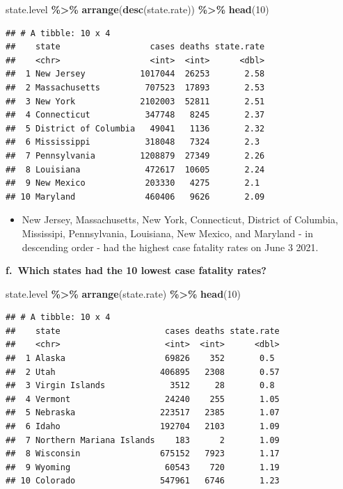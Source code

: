 \documentclass[
  openany]{book}
\newenvironment{Shaded}{\begin{snugshade}}{\end{snugshade}}
\newcommand{\DecValTok}[1]{\textcolor[rgb]{0.00,0.00,0.81}{#1}}
\newcommand{\FunctionTok}[1]{\textcolor[rgb]{0.13,0.29,0.53}{\textbf{#1}}}
\newcommand{\NormalTok}[1]{#1}
\newcommand{\SpecialCharTok}[1]{\textcolor[rgb]{0.81,0.36,0.00}{\textbf{#1}}}
\providecommand{\tightlist}{%
  \setlength{\itemsep}{0pt}\setlength{\parskip}{0pt}}
\begin{document}
\begin{Shaded}
\begin{Highlighting}[]
\NormalTok{state.level }\SpecialCharTok{\%\textgreater{}\%} 
  \FunctionTok{arrange}\NormalTok{(}\FunctionTok{desc}\NormalTok{(state.rate)) }\SpecialCharTok{\%\textgreater{}\%} 
  \FunctionTok{head}\NormalTok{(}\DecValTok{10}\NormalTok{)}
\end{Highlighting}
\end{Shaded}

\begin{verbatim}
## # A tibble: 10 x 4
##    state                  cases deaths state.rate
##    <chr>                  <int>  <int>      <dbl>
##  1 New Jersey           1017044  26253       2.58
##  2 Massachusetts         707523  17893       2.53
##  3 New York             2102003  52811       2.51
##  4 Connecticut           347748   8245       2.37
##  5 District of Columbia   49041   1136       2.32
##  6 Mississippi           318048   7324       2.3 
##  7 Pennsylvania         1208879  27349       2.26
##  8 Louisiana             472617  10605       2.24
##  9 New Mexico            203330   4275       2.1 
## 10 Maryland              460406   9626       2.09
\end{verbatim}

\begin{itemize}
\tightlist
\item
  New Jersey, Massachusetts, New York, Connecticut, District of Columbia, Mississipi, Pennsylvania, Louisiana, New Mexico, and Maryland - in descending order - had the highest case fatality rates on June 3 2021.
\end{itemize}

\textbf{f.~Which states had the 10 lowest case fatality rates?}

\begin{Shaded}
\begin{Highlighting}[]
\NormalTok{state.level }\SpecialCharTok{\%\textgreater{}\%} 
  \FunctionTok{arrange}\NormalTok{(state.rate) }\SpecialCharTok{\%\textgreater{}\%} 
  \FunctionTok{head}\NormalTok{(}\DecValTok{10}\NormalTok{)}
\end{Highlighting}
\end{Shaded}

\begin{verbatim}
## # A tibble: 10 x 4
##    state                     cases deaths state.rate
##    <chr>                     <int>  <int>      <dbl>
##  1 Alaska                    69826    352       0.5 
##  2 Utah                     406895   2308       0.57
##  3 Virgin Islands             3512     28       0.8 
##  4 Vermont                   24240    255       1.05
##  5 Nebraska                 223517   2385       1.07
##  6 Idaho                    192704   2103       1.09
##  7 Northern Mariana Islands    183      2       1.09
##  8 Wisconsin                675152   7923       1.17
##  9 Wyoming                   60543    720       1.19
## 10 Colorado                 547961   6746       1.23
\end{verbatim}
\end{document}
